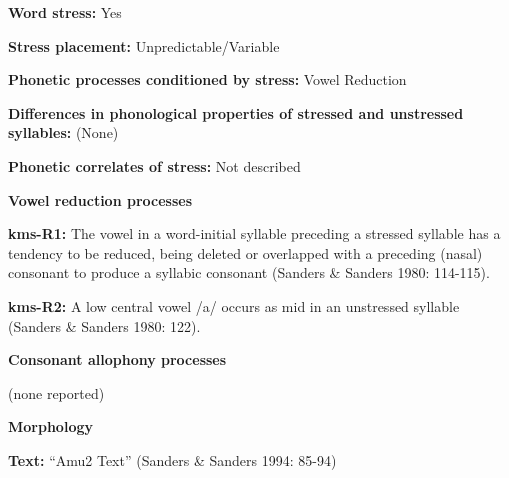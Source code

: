 \begin{styleBody}
\textbf{Word stress:} Yes
\end{styleBody}

\begin{styleBody}
\textbf{Stress placement:} Unpredictable/Variable
\end{styleBody}

\begin{styleBody}
\textbf{Phonetic processes conditioned by stress:} Vowel Reduction
\end{styleBody}

\begin{styleBody}
\textbf{Differences in phonological properties of stressed and unstressed syllables:} (None)
\end{styleBody}

\begin{styleBody}
\textbf{Phonetic correlates of stress: }Not described
\end{styleBody}

\begin{styleBody}
\textbf{Vowel reduction processes}
\end{styleBody}

\begin{styleBody}
\textbf{kms-R1:} The vowel in a word-initial syllable preceding a stressed syllable has a tendency to be reduced, being deleted or overlapped with a preceding (nasal) consonant to produce a syllabic consonant (Sanders \& Sanders 1980: 114-115).
\end{styleBody}

\begin{styleBody}
\textbf{kms-R2:} A low central vowel /a/ occurs as mid in an unstressed syllable (Sanders \& Sanders 1980: 122).
\end{styleBody}

\begin{styleBody}
\textbf{Consonant allophony processes}
\end{styleBody}

\begin{styleBody}
(none reported)
\end{styleBody}

\begin{styleBody}
\textbf{Morphology}
\end{styleBody}

\begin{styleBody}
\textbf{Text:} “Amu2 Text” (Sanders \& Sanders 1994: 85-94)
\end{styleBody}

